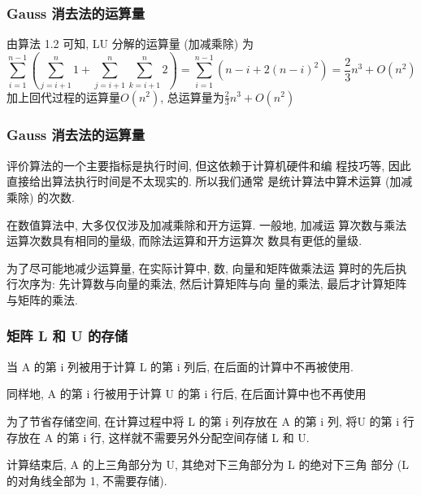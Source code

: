 \documentclass[notheorems,serif]{beamer}
\begin{document}
\begin{frame}
\frametitle{Gauss 消去法的运算量}
由算法 1.2 可知, LU 分解的运算量 (加减乘除) 为
$$
\sum_{i=1}^{n-1}\left(\sum_{j=i+1}^{n} 1+\sum_{j=i+1}^{n} \sum_{k=i+1}^{n} 2\right)=\sum_{i=1}^{n-1}\left(n-i+2(n-i)^{2}\right)=\frac{2}{3} n^{3}+O\left(n^{2}\right)
$$
加上回代过程的运算量$O\left(n^{2}\right)$, 总运算量为$\frac{2}{3} n^{3}+O\left(n^{2}\right)$
\end{frame}

\begin{frame}
\frametitle{Gauss 消去法的运算量}

\qquad{\red{$\dagger$}} 评价算法的一个主要指标是执行时间, 但这依赖于计算机硬件和编
程技巧等, 因此直接给出算法执行时间是不太现实的. 所以我们通常
是统计算法中算术运算 (加减乘除) 的次数.

\qquad{\red{$\dagger$}} 在数值算法中, 大多仅仅涉及加减乘除和开方运算. 一般地, 加减运
算次数与乘法运算次数具有相同的量级, 而除法运算和开方运算次
数具有更低的量级.

\qquad{\red{$\dagger$}} 为了尽可能地减少运算量, 在实际计算中, 数, 向量和矩阵做乘法运
算时的先后执行次序为: 先计算数与向量的乘法, 然后计算矩阵与向
量的乘法, 最后才计算矩阵与矩阵的乘法.
\end{frame}

\begin{frame}
\frametitle{矩阵 L 和 U 的存储}

当 A 的第 i 列被用于计算 L 的第 i 列后, 在后面的计算中不再被使用.

同样地, A 的第 i 行被用于计算 U 的第 i 行后, 在后面计算中也不再使用


为了节省存储空间, 在计算过程中将 L 的第 i 列存放在 A 的第 i 列, 将U 的第 i 行存放在 A 的第 i 行, 这样就不需要另外分配空间存储 L 和 U.

计算结束后, A 的上三角部分为 U, 其绝对下三角部分为 L 的绝对下三角
部分 (L 的对角线全部为 1, 不需要存储).
\end{frame}
\end{document}
